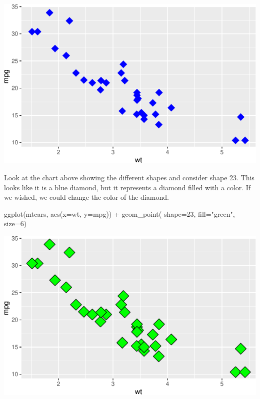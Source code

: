 \documentclass[
  letterpaper,
  DIV=11,
  numbers=noendperiod]{scrreprt}
\newenvironment{Shaded}{\begin{snugshade}}{\end{snugshade}}
\newcommand{\AttributeTok}[1]{\textcolor[rgb]{0.40,0.45,0.13}{#1}}
\newcommand{\DecValTok}[1]{\textcolor[rgb]{0.68,0.00,0.00}{#1}}
\newcommand{\FunctionTok}[1]{\textcolor[rgb]{0.28,0.35,0.67}{#1}}
\newcommand{\NormalTok}[1]{\textcolor[rgb]{0.00,0.23,0.31}{#1}}
\newcommand{\SpecialCharTok}[1]{\textcolor[rgb]{0.37,0.37,0.37}{#1}}
\newcommand{\StringTok}[1]{\textcolor[rgb]{0.13,0.47,0.30}{#1}}
\begin{document}
\includegraphics{Advanced_Scatterplot_Techniques_files/figure-pdf/unnamed-chunk-5-1.pdf}

Look at the chart above showing the different shapes and consider shape
23. This looks like it is a blue diamond, but it represents a diamond
filled with a color. If we wished, we could change the color of the
diamond.

\begin{Shaded}
\begin{Highlighting}[]
\FunctionTok{ggplot}\NormalTok{(mtcars, }\FunctionTok{aes}\NormalTok{(}\AttributeTok{x=}\NormalTok{wt, }\AttributeTok{y=}\NormalTok{mpg)) }\SpecialCharTok{+}
  \FunctionTok{geom\_point}\NormalTok{( }\AttributeTok{shape=}\DecValTok{23}\NormalTok{, }\AttributeTok{fill=}\StringTok{"green"}\NormalTok{, }\AttributeTok{size=}\DecValTok{6}\NormalTok{)}
\end{Highlighting}
\end{Shaded}

\includegraphics{Advanced_Scatterplot_Techniques_files/figure-pdf/unnamed-chunk-6-1.pdf}
\end{document}
